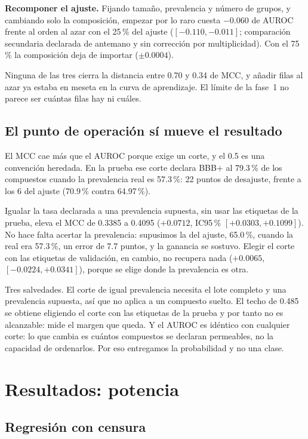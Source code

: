 \documentclass[twocolumn,10pt,letterpaper]{article}
\begin{document}
\textbf{Recomponer el ajuste.} Fijando tamaño, prevalencia y número de grupos, y cambiando solo la composición, empezar por lo raro cuesta $-0.060$ de AUROC frente al orden al azar con el 25\,\% del ajuste ($[-0.110, -0.011]$; comparación secundaria declarada de antemano y sin corrección por multiplicidad). Con el 75\,\% la composición deja de importar ($\pm 0.0004$).

Ninguna de las tres cierra la distancia entre 0.70 y 0.34 de MCC, y añadir filas al azar ya estaba en meseta en la curva de aprendizaje. El límite de la fase~1 no parece ser cuántas filas hay ni cuáles.

\subsection{El punto de operación sí mueve el resultado}
\label{sec:corte}

El MCC cae más que el AUROC porque exige un corte, y el 0.5 es una convención heredada. En la prueba ese corte declara BBB+ al 79.3\,\% de los compuestos cuando la prevalencia real es 57.3\,\%: 22 puntos de desajuste, frente a los 6 del ajuste (70.9\,\% contra 64.97\,\%).

Igualar la tasa declarada a una prevalencia supuesta, sin usar las etiquetas de la prueba, eleva el MCC de 0.3385 a 0.4095 ($+0.0712$, IC95\,\% $[+0.0303, +0.1099]$). No hace falta acertar la prevalencia: supusimos la del ajuste, 65.0\,\%, cuando la real era 57.3\,\%, un error de 7.7 puntos, y la ganancia se sostuvo. Elegir el corte con las etiquetas de validación, en cambio, no recupera nada ($+0.0065$, $[-0.0224, +0.0341]$), porque se elige donde la prevalencia es otra.

Tres salvedades. El corte de igual prevalencia necesita el lote completo y una prevalencia supuesta, así que no aplica a un compuesto suelto. El techo de 0.485 se obtiene eligiendo el corte con las etiquetas de la prueba y por tanto no es alcanzable: mide el margen que queda. Y el AUROC es idéntico con cualquier corte: lo que cambia es cuántos compuestos se declaran permeables, no la capacidad de ordenarlos. Por eso entregamos la probabilidad y no una clase.

\section{Resultados: potencia}

\subsection{Regresión con censura}
\end{document}
